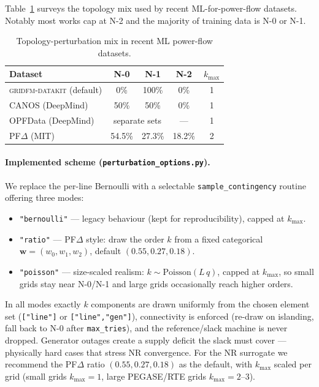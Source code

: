 \documentclass{article}
\begin{document}
Table~\ref{tab:cont_ratio} surveys the topology mix used by recent ML-for-power-flow
datasets.  Notably most works cap at N-2 and the majority of training data is
N-0 or N-1.

\begin{table}[h]
\centering
\caption{Topology-perturbation mix in recent ML power-flow datasets.}
\label{tab:cont_ratio}
\renewcommand{\arraystretch}{1.2}
\begin{tabular}{lcccc}
\toprule
Dataset & N-0 & N-1 & N-2 & $k_{\max}$ \\
\midrule
\textsc{gridfm-datakit} (default) \cite{gridfm2024} & 0\% & 100\% & 0\% & 1 \\
CANOS (DeepMind) \cite{canos2024}                   & 50\% & 50\% & 0\% & 1 \\
OPFData (DeepMind) \cite{opfdata2024}               & \multicolumn{2}{c}{separate sets} & --- & 1 \\
PF$\Delta$ (MIT) \cite{pfdelta2025}                 & 54.5\% & 27.3\% & 18.2\% & 2 \\
\bottomrule
\end{tabular}
\end{table}

\paragraph{Implemented scheme (\texttt{perturbation\_options.py}).}
We replace the per-line Bernoulli with a selectable
\texttt{sample\_contingency} routine offering three modes:
\begin{itemize}[noitemsep]
  \item \texttt{"bernoulli"} --- legacy behaviour (kept for reproducibility),
        capped at $k_{\max}$.
  \item \texttt{"ratio"} --- PF$\Delta$ style: draw the order $k$ from a fixed
        categorical $\mathbf{w} = (w_0, w_1, w_2)$, default $(0.55, 0.27, 0.18)$.
  \item \texttt{"poisson"} --- size-scaled realism:
        $k \sim \mathrm{Poisson}(L\,q)$, capped at $k_{\max}$, so small grids
        stay near N-0/N-1 and large grids occasionally reach higher orders.
\end{itemize}
In all modes exactly $k$ components are drawn uniformly from the chosen element
set (\texttt{["line"]} or \texttt{["line","gen"]}), connectivity is enforced
(re-draw on islanding, fall back to N-0 after \texttt{max\_tries}), and the
reference/slack machine is never dropped.  Generator outages create a supply
deficit the slack must cover --- physically hard cases that stress NR
convergence.  For the NR surrogate we recommend the PF$\Delta$ ratio
$(0.55,0.27,0.18)$ as the default, with $k_{\max}$ scaled per grid (small grids
$k_{\max}{=}1$, large PEGASE/RTE grids $k_{\max}{=}2$--$3$).
\end{document}
